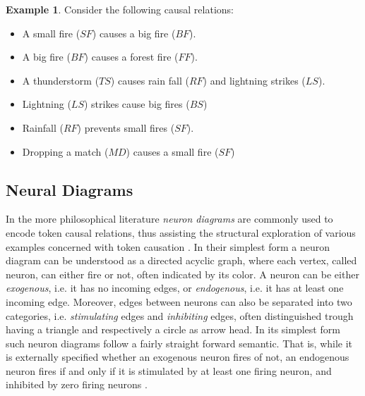\documentclass[11pt,a4paper]{book}
\theoremstyle{definition}
\theoremstyle{definition}
\newtheorem{example}{Example}[section]
\theoremstyle{definition}
\theoremstyle{remark}
\begin{document}
\begin{example}
\label{ex:causal_model_forrest_fire_3}
Consider the following causal relations:
\begin{itemize}
\item A small fire ($\mathit{SF}$) causes a big fire ($\mathit{BF}$).
\item A big fire ($\mathit{BF}$) causes a forest fire ($\mathit{FF}$).
\item A thunderstorm ($\mathit{TS}$) causes rain fall ($\mathit{RF}$) and lightning strikes ($\mathit{LS}$).
\item Lightning  ($\mathit{LS}$) strikes cause big fires  ($\mathit{BS}$)
\item Rainfall ($\mathit{RF}$) prevents small fires ($\mathit{SF}$).  
\item Dropping a match ($\mathit{MD}$) causes a small fire ($\mathit{SF}$)
\end{itemize}
\end{example}

\subsection{Neural Diagrams}
\label{sec:neural_diagrams}
In the more philosophical literature \emph{neuron diagrams} are commonly used to encode token causal relations, thus assisting the structural exploration of various examples concerned with token causation \cite{baumgartner2013regularity,erwig2010causal}. 
In their simplest form a neuron diagram can be understood as a directed acyclic graph, where each vertex, called neuron, can either fire or not, often indicated by its color. A neuron can be either \emph{exogenous}, i.e. it has no incoming edges, or \emph{endogenous}, i.e. it has at least one incoming edge. Moreover, edges between neurons can also be separated into two categories, i.e. \emph{stimulating} edges and \emph{inhibiting} edges, often distinguished trough having a triangle and respectively a circle as arrow head. 
In its simplest form such neuron diagrams follow a fairly straight forward semantic. That is, while it is externally specified whether an exogenous neuron fires of not, an endogenous neuron fires if and only if it is stimulated by at least one firing neuron, and inhibited by zero firing neurons \cite{hitchcock2009structural,erwig2010causal,baumgartner2013regularity}. 
\end{document}
